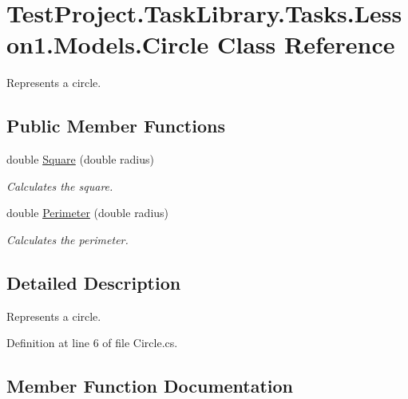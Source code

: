 \hypertarget{class_test_project_1_1_task_library_1_1_tasks_1_1_lesson1_1_1_models_1_1_circle}{}\section{Test\+Project.\+Task\+Library.\+Tasks.\+Lesson1.\+Models.\+Circle Class Reference}
\label{class_test_project_1_1_task_library_1_1_tasks_1_1_lesson1_1_1_models_1_1_circle}


Represents a circle.  


\subsection*{Public Member Functions}
\begin{DoxyCompactItemize}
\item 
double \mbox{\hyperlink{class_test_project_1_1_task_library_1_1_tasks_1_1_lesson1_1_1_models_1_1_circle_acf8a9495bb92085494ac28fb5ded7b84}{Square}} (double radius)
\begin{DoxyCompactList}\small\item\em Calculates the square. \end{DoxyCompactList}\item 
double \mbox{\hyperlink{class_test_project_1_1_task_library_1_1_tasks_1_1_lesson1_1_1_models_1_1_circle_a57e390522687847ef19ec29fa2993d29}{Perimeter}} (double radius)
\begin{DoxyCompactList}\small\item\em Calculates the perimeter. \end{DoxyCompactList}\end{DoxyCompactItemize}


\subsection{Detailed Description}
Represents a circle. 



Definition at line 6 of file Circle.\+cs.



\subsection{Member Function Documentation}
\mbox{\label{class_test_project_1_1_task_library_1_1_tasks_1_1_lesson1_1_1_models_1_1_circle_a57e390522687847ef19ec29fa2993d29}} 
